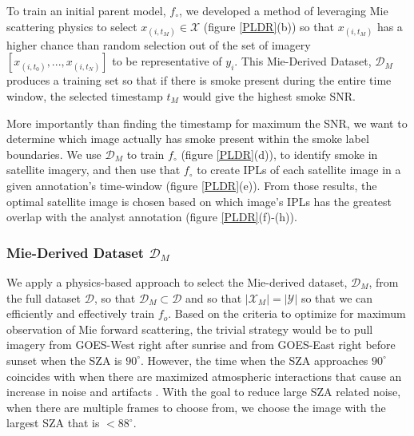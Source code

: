 \documentclass{article}
\begin{document}
To train an initial parent model, \(f_{\circ}\), we developed a method of leveraging Mie scattering physics to select \(x_{(i,t_M)} \in \mathcal{X}\) (figure \ref{PLDR}(b)) so that \(x_{(i,t_M)}\) has a higher chance than random selection out of the set of imagery \([x_{(i,t_0)},...,x_{(i,t_N)}]\) to be representative of \(y_i\). This Mie-Derived Dataset, \(\mathcal{D}_M\) produces a training set so that if there is smoke present during the entire time window, the selected timestamp \(t_M\) would give the highest smoke SNR. 

More importantly than finding the timestamp for maximum the SNR, we want to determine which image actually has smoke present within the smoke label boundaries. We use \(\mathcal{D}_M\) to train \(f_{\circ}\) (figure \ref{PLDR}(d)), to identify smoke in satellite imagery, and then use that \(f_{\circ}\) to create IPLs of each satellite image in a given annotation's time-window (figure \ref{PLDR}(e)). From those results, the optimal satellite image is chosen based on which image's IPLs has the greatest overlap with the analyst annotation (figure \ref{PLDR}(f)-(h)).



\subsubsection{Mie-Derived Dataset \(\mathcal{D}_M\)}

We apply a physics-based approach to select the Mie-derived dataset, \(\mathcal{D}_M\), from the full dataset \(\mathcal{D}\), so that \(\mathcal{D}_M \subset \mathcal{D}\) and so that \(|\mathcal{X}_M|=|\mathcal{Y}|\) so that we can efficiently and effectively train \(f_o\). Based on the criteria to optimize for maximum observation of Mie forward scattering, the trivial strategy would be to pull imagery from GOES-West right after sunrise and from GOES-East right before sunset when the SZA is \(90^{\circ}\). However, the time when the SZA approaches \(90^{\circ}\) coincides with when there are maximized atmospheric interactions that cause an increase in noise and artifacts \cite{zen_angle}. With the goal to reduce large SZA related noise, when there are multiple frames to choose from, we choose the image with the largest SZA that is \(<88^{\circ}\).
\end{document}
